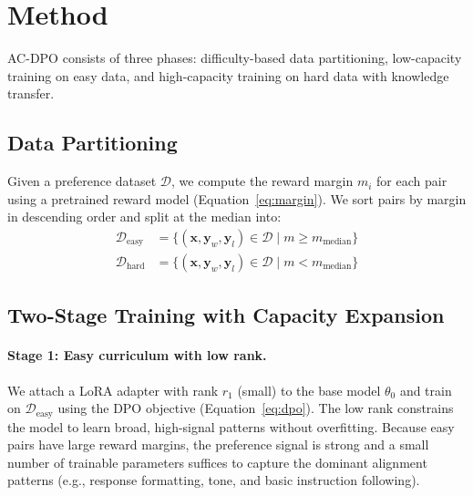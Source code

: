 \documentclass{article}
\begin{document}
\section{Method}

AC-DPO consists of three phases: difficulty-based data partitioning, low-capacity training on easy data, and high-capacity training on hard data with knowledge transfer.

\subsection{Data Partitioning}

Given a preference dataset $\mathcal{D}$, we compute the reward margin $m_i$ for each pair using a pretrained reward model (Equation~\ref{eq:margin}). We sort pairs by margin in descending order and split at the median into:
\begin{align}
\mathcal{D}_{\text{easy}} &= \{(\mathbf{x}, \mathbf{y}_w, \mathbf{y}_l) \in \mathcal{D} \mid m \geq m_{\text{median}}\} \\
\mathcal{D}_{\text{hard}} &= \{(\mathbf{x}, \mathbf{y}_w, \mathbf{y}_l) \in \mathcal{D} \mid m < m_{\text{median}}\}
\end{align}

\subsection{Two-Stage Training with Capacity Expansion}

\paragraph{Stage 1: Easy curriculum with low rank.}
We attach a LoRA adapter with rank $r_1$ (small) to the base model $\theta_0$ and train on $\mathcal{D}_{\text{easy}}$ using the DPO objective (Equation~\ref{eq:dpo}). The low rank constrains the model to learn broad, high-signal patterns without overfitting. Because easy pairs have large reward margins, the preference signal is strong and a small number of trainable parameters suffices to capture the dominant alignment patterns (e.g., response formatting, tone, and basic instruction following).
\end{document}
